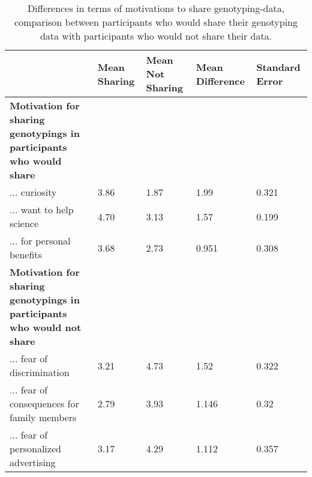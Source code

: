 \documentclass[10pt]{article}
\begin{document}
\begin{table}
\caption{Differences in terms of motivations to share genotyping-data, comparison between participants who would share their genotyping data with participants who would not share their data.}
\begin{tabular}{|p{7cm}|p{2cm}|p{2cm}|p{2cm}|p{2cm}|}
\hline
& Mean {Sharing} & Mean {Not Sharing} & Mean Difference & Standard Error \\ 
\hline
\textbf{Motivation for sharing genotypings in participants who would share} & & & & \\
\hline
... curiosity & 3.86 & 1.87 & 1.99 & 0.321 \\ \hline %
... want to help science & 4.70 & 3.13 & 1.57 & 0.199 \\ \hline %
... for personal benefits & 3.68 & 2.73 & 0.951 & 0.308 \\ \hline %
\textbf{Motivation for sharing genotypings in participants who would not share} & & & & \\
\hline
... fear of discrimination & 3.21 & 4.73 & 1.52 & 0.322 \\ \hline %
... fear of consequences for family members & 2.79 & 3.93 & 1.146 & 0.32 \\ \hline %
... fear of personalized advertising & 3.17 & 4.29 & 1.112 & 0.357 \\ \hline %
\end{tabular}
\label{tab:motivations2}
\end{table}
\end{document}
